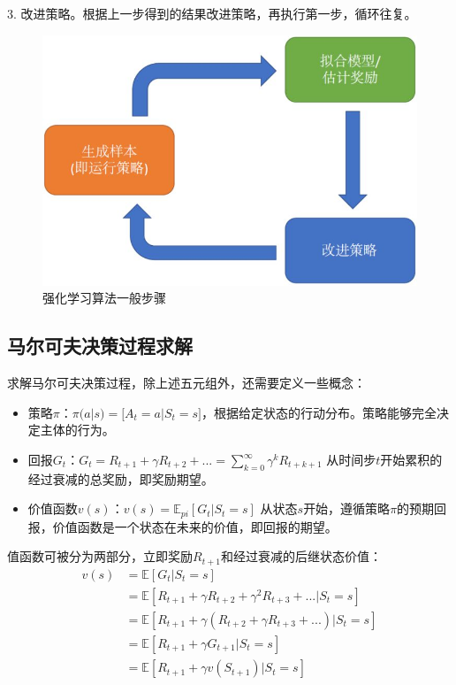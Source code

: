 3. 改进策略。根据上一步得到的结果改进策略，再执行第一步，循环往复。
\begin{figure}[!htbp]\centering
\vspace{1em}
  \includegraphics[width=0.6\linewidth]{figures/RL_process.jpg}
  \caption{强化学习算法一般步骤}
  \label{fig:RL_process}       %
  \vspace{1em}
\end{figure}

\subsection{马尔可夫决策过程求解}
求解马尔可夫决策过程，除上述五元组外，还需要定义一些概念：
\begin{itemize}
\item 策略$\pi$：$\pi(a|s)=\mathbb[A_t=a|S_t=s]$，根据给定状态的行动分布。策略能够完全决定主体的行为。
\item 回报$G_t$：$G_t = R_{t+1} + \gamma R_{t+2} + ... = \sum_{k=0}^\infty \gamma^kR_{t+k+1}$ 从时间步$t$开始累积的经过衰减的总奖励，即奖励期望。
\item 价值函数$v(s)$：$v(s)=\mathbb{E}_{pi}[G_t|S_t=s]$ 从状态$s$开始，遵循策略$\pi$的预期回报，价值函数是一个状态在未来的价值，即回报的期望。
\end{itemize}
值函数可被分为两部分，立即奖励$R_{t+1}$和经过衰减的后继状态价值：
\begin{equation}\label{eq:Bellman}
\begin{aligned}
v(s) & = \mathbb{E}[G_t|S_t = s] \\
     & = \mathbb{E}[R_{t+1} + \gamma R_{t+2} + \gamma^2 R_{t+3}+...|S_t=s]\\
     & = \mathbb{E}[R_{t+1} + \gamma(R_{t+2} + \gamma R_{t+3}+...)|S_t=s]\\
     & = \mathbb{E}[R_{t+1} + \gamma G_{t+1}|S_t=s]\\
     & = \mathbb{E}[R_{t+1} + \gamma v(S_{t+1})|S_t=s]\\
\end{aligned}
\end{equation}


